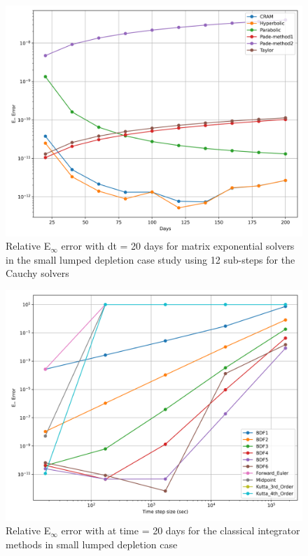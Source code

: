 \begin{figure}[p]
    \centering
    \includegraphics[width=5in]{images/chapter-5/caseStudies/smallLumpedDepletion/msrSmallLumpDepletionEinfErrorerrorSteps12.png}
    \caption{Relative E$_{\infty}$ error with dt = 20 days for matrix exponential solvers in the small lumped depletion case study using 12 sub-steps for the Cauchy solvers}
    \label{fig:small_lumped_depletion_Einf_steps12}
\end{figure}

\clearpage

\begin{figure}[p]
    \centering
    \includegraphics[width=5in]{images/chapter-5/caseStudies/smallLumpedDepletion/msrSmallLumpedDepletionEinfErrorerrorIntegrators.png}
    \caption{Relative E$_{\infty}$ error with at time = 20 days for the classical integrator methods in small lumped depletion case}
    \label{fig:small_lumped_depletion_Einf_integrators}
\end{figure}

